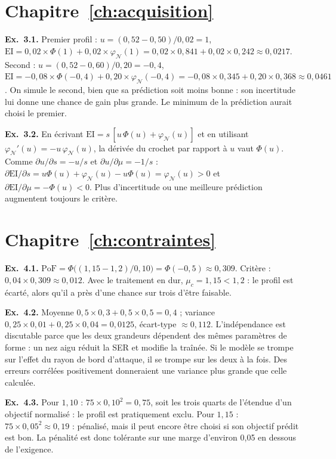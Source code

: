 \section*{Chapitre~\ref{ch:acquisition} }
\textbf{Ex.~3.1.} Premier profil : $u=(0{,}52-0{,}50)/0{,}02=1$, $\mathrm{EI}=0{,}02\times\Phi(1)+0{,}02\times\varphi_{\mathcal N}(1)=0{,}02\times0{,}841+0{,}02\times0{,}242\approx0{,}0217$. Second : $u=(0{,}52-0{,}60)/0{,}20=-0{,}4$, $\mathrm{EI}=-0{,}08\times\Phi(-0{,}4)+0{,}20\times\varphi_{\mathcal N}(-0{,}4)=-0{,}08\times0{,}345+0{,}20\times0{,}368\approx0{,}0461$. On simule le second, bien que sa prédiction soit moins bonne : son incertitude lui donne une chance de gain plus grande. Le minimum de la prédiction aurait choisi le premier.

\textbf{Ex.~3.2.} En écrivant $\mathrm{EI}=s\,[u\,\Phi(u)+\varphi_{\mathcal N}(u)]$ et en utilisant $\varphi_{\mathcal N}'(u)=-u\,\varphi_{\mathcal N}(u)$, la dérivée du crochet par rapport à $u$ vaut $\Phi(u)$. Comme $\partial u/\partial s=-u/s$ et $\partial u/\partial\mu=-1/s$ : $\partial\mathrm{EI}/\partial s=u\Phi(u)+\varphi_{\mathcal N}(u)-u\Phi(u)=\varphi_{\mathcal N}(u)>0$ et $\partial\mathrm{EI}/\partial\mu=-\Phi(u)<0$. Plus d'incertitude ou une meilleure prédiction augmentent toujours le critère.

\section*{Chapitre~\ref{ch:contraintes} }
\textbf{Ex.~4.1.} $\mathrm{PoF}=\Phi\big((1{,}15-1{,}2)/0{,}10\big)=\Phi(-0{,}5)\approx0{,}309$. Critère : $0{,}04\times0{,}309\approx0{,}012$. Avec le traitement en dur, $\mu_c=1{,}15<1{,}2$ : le profil est écarté, alors qu'il a près d'une chance sur trois d'être faisable.

\textbf{Ex.~4.2.} Moyenne $0{,}5\times0{,}3+0{,}5\times0{,}5=0{,}4$ ; variance $0{,}25\times0{,}01+0{,}25\times0{,}04=0{,}0125$, écart-type $\approx0{,}112$. L'indépendance est discutable parce que les deux grandeurs dépendent des mêmes paramètres de forme : un nez aigu réduit la SER et modifie la traînée. Si le modèle se trompe sur l'effet du rayon de bord d'attaque, il se trompe sur les deux à la fois. Des erreurs corrélées positivement donneraient une variance plus grande que celle calculée.

\textbf{Ex.~4.3.} Pour $1{,}10$ : $75\times0{,}10^2=0{,}75$, soit les trois quarts de l'étendue d'un objectif normalisé : le profil est pratiquement exclu. Pour $1{,}15$ : $75\times0{,}05^2\approx0{,}19$ : pénalisé, mais il peut encore être choisi si son objectif prédit est bon. La pénalité est donc tolérante sur une marge d'environ 0,05 en dessous de l'exigence.

